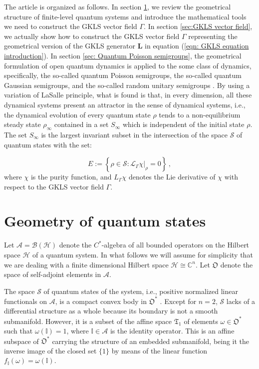 \documentclass[11pt]{article}
\newcommand{\be}{\begin{equation}}
\newcommand{\ee}{\end{equation}}
\newcommand{\vsp}{\vspace{0.4cm}}
\newcommand{\appa}{\mathcal{A}}
\newcommand{\stsp}{\mathcal{S}}
\newcommand{\obsp}{\mathfrak{O}}
\begin{document}
\vsp

The article is organized as follows.
In section \ref{sec: Geometry of quantum states}, we review the geometrical structure of finite-level quantum systems and introduce  the mathematical tools we need to construct the GKLS vector field $\Gamma$.
In section \ref{sec:GKLS vector field}, we actually show how to construct the GKLS vector field $\Gamma$ representing the geometrical version of the GKLS generator $\mathbf{L}$ in equation (\ref{eqn: GKLS equation introduction}).
In section \ref{sec: Quantum Poisson semigroups}, the geometrical formulation of open quantum dynamics is applied to the some class of dynamics, specifically, the so-called quantum Poisson semigroups, the so-called quantum Gaussian semigroups,
 and the so-called random unitary semigroups \cite{lindblad-on_the_generators_of_quantum_dynamical_semigroups,kossakowski-on_quantum_statistical_mechanics_of_non_hamiltonian_systems,aniello_kossakowski_marmo_ventriglia-quantum_brownian_motion_on_lie_groups_and_open_quantum_systems}.
By using a variation of LaSalle principle, what is found is that, in every dimension, all these dynamical systems present an attractor in the sense of dynamical systems, i.e., the dynamical evolution of every quantum state $\rho$ tends to a non-equilibrium steady state $\rho_{\infty}$ contained in a set $S_{\infty}$ which is independent of the initial state $\rho$.
The set $S_{\infty}$ is the largest invariant subset in the intersection of the space $\stsp$ of quantum states with the set:

\be
E:=\left\{\rho\in\stsp\colon \left.\mathcal{L}_{\Gamma}\chi\right|_{\rho}=0\right\}\,,
\ee
where $\chi$ is the purity function, and $L_{\Gamma}\chi$ denotes the Lie derivative of $\chi$ with respect to the GKLS vector field $\Gamma$.


\section{Geometry of quantum states}\label{sec: Geometry of quantum states}

Let $\appa=\mathcal{B}(\mathcal{H})$ denote the $C^{*}$-algebra of  all bounded operators on the Hilbert space $\mathcal{H}$ of a quantum system.  In what follows we will assume for simplicity that we are dealing with a finite dimensional Hilbert space $\mathcal{H}\cong\mathbb{C}^{n}$.
Let $\obsp$ denote the space of self-adjoint elements in $\appa$.

The space $\stsp$ of quantum states of the system, i.e., positive normalized linear functionals on $\mathcal{A}$, is a compact convex body in $\obsp^{*}$ \cite{bratteli_robinson-operator_algebras_and_quantum_statistical_mechanics_1,dixmier-c*_algebras}.
Except for $n=2$, $\stsp$ lacks of a differential structure as a whole because its boundary is not a smooth submanifold.
However, it is a subset of the affine space $\mathfrak{T}_{1}$ of elements  $\omega\in\obsp^{*}$ such that $\omega(\mathbb{I})=1$, where $\mathbb{I}\in\appa$ is the identity operator.
This is an affine subspace of $\obsp^{*}$ carrying the structure of an embedded submanifold, being it the inverse image of the closed set $\{1\}$ by means of the linear function $f_{\mathbb{I}}(\omega)=\omega(\mathbb{I})$.    
\end{document}
